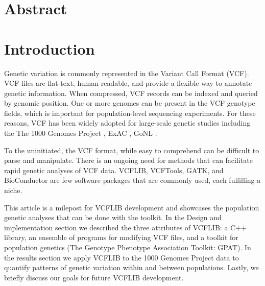 \documentclass[10pt,letterpaper]{article}
\begin{document}
\section*{Abstract}




\linenumbers

\section*{Introduction}

Genetic variation is commonly represented in the Variant Call Format (VCF)\cite{vcftools}.  VCF files are flat-text, human-readable, and provide a flexible way to annotate genetic information.  When compressed, VCF records can be indexed and queried by genomic position\cite{tabix}. One or more genomes can be present in the VCF genotype fields, which is important for population-level sequencing experiments. For these reasons, VCF has been widely adopted for large-scale genetic studies including the The 1000 Genomes Project \cite{1kg}, ExAC \cite{exac}, GoNL \cite{gonl}.

To the uninitiated, the VCF format, while easy to comprehend can be difficult to parse and manipulate. There is an ongoing need for methods that can facilitate rapid genetic analyses of VCF data.  VCFLIB, VCFTools\cite{vcftools}, GATK,  and BioConductor are few software packages that are commonly used, each fulfilling a niche. 

This article is a milepost for VCFLIB development and showcases the population genetic analyses that can be done with the toolkit. In the Design and implementation section we described the three attributes of VCFLIB: a C++ library, an ensemble of programs for modifying VCF files, and a toolkit for population genetics (The Genotype Phenotype Association Toolkit: GPAT). In the results section we apply VCFLIB to the 1000 Genomes Project data to quantify patterns of genetic variation within and between populations.  Lastly, we briefly discuss our goals for future VCFLIB development.



\end{document}
